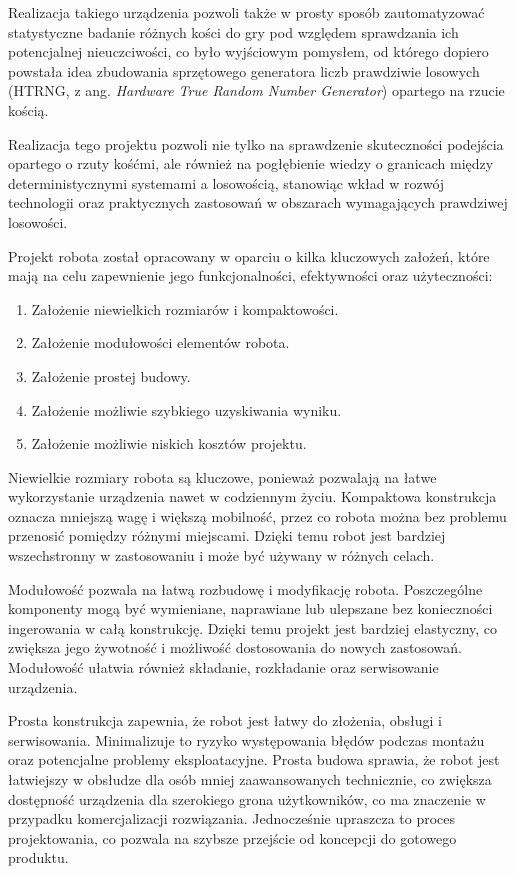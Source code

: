 Realizacja takiego urządzenia pozwoli także w prosty sposób zautomatyzować statystyczne badanie różnych
kości do gry pod względem sprawdzania ich potencjalnej nieuczciwości,
co było wyjściowym pomysłem, od którego dopiero powstała idea zbudowania sprzętowego generatora liczb prawdziwie losowych
(HTRNG, z ang. \textit{Hardware True Random Number Generator}) opartego na rzucie kością.

Realizacja tego projektu pozwoli nie tylko na sprawdzenie skuteczności podejścia opartego o rzuty kośćmi,
ale również na pogłębienie wiedzy o granicach między deterministycznymi systemami a losowością,
stanowiąc wkład w rozwój technologii oraz praktycznych zastosowań w obszarach wymagających prawdziwej losowości.

Projekt robota został opracowany w oparciu o kilka kluczowych założeń, które mają na celu zapewnienie jego funkcjonalności, efektywności oraz użyteczności:
\begin{enumerate}
    \item Założenie niewielkich rozmiarów i kompaktowości.
    \item Założenie modułowości elementów robota.
    \item Założenie prostej budowy.
    \item Założenie możliwie szybkiego uzyskiwania wyniku.
    \item Założenie możliwie niskich kosztów projektu.
\end{enumerate}

Niewielkie rozmiary robota są kluczowe, ponieważ pozwalają na łatwe wykorzystanie urządzenia nawet w codziennym życiu.
Kompaktowa konstrukcja oznacza mniejszą wagę i większą mobilność, przez co robota można bez problemu przenosić pomiędzy różnymi miejscami.
Dzięki temu robot jest bardziej wszechstronny w zastosowaniu i może być używany w różnych celach.

Modułowość pozwala na łatwą rozbudowę i modyfikację robota.
Poszczególne komponenty mogą być wymieniane, naprawiane lub ulepszane bez konieczności ingerowania w całą konstrukcję.
Dzięki temu projekt jest bardziej elastyczny, co zwiększa jego żywotność i możliwość dostosowania do nowych zastosowań.
Modułowość ułatwia również składanie, rozkładanie oraz serwisowanie urządzenia.

Prosta konstrukcja zapewnia, że robot jest łatwy do złożenia, obsługi i serwisowania.
Minimalizuje to ryzyko występowania błędów podczas montażu oraz potencjalne problemy eksploatacyjne.
Prosta budowa sprawia, że robot jest łatwiejszy w obsłudze dla osób mniej zaawansowanych technicznie, co zwiększa dostępność
urządzenia dla szerokiego grona użytkowników, co ma znaczenie w przypadku komercjalizacji rozwiązania.
Jednocześnie upraszcza to proces projektowania, co pozwala na szybsze przejście od koncepcji do gotowego produktu.

